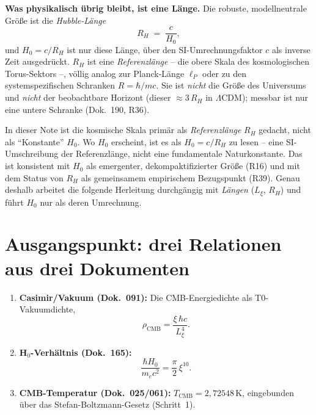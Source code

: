 \textbf{Was physikalisch übrig bleibt, ist eine Länge.} Die robuste,
modellneutrale Größe ist die \emph{Hubble-Länge}
\begin{equation}
  R_H \;=\; \frac{c}{H_0},
  \label{eq:RH}
\end{equation}
und $H_0 = c/R_H$ ist nur diese Länge, über den SI-Umrechnungsfaktor $c$ als
inverse Zeit ausgedrückt. $R_H$ ist eine \emph{Referenzlänge} -- die obere
Skala des kosmologischen Torus-Sektors --, völlig analog zur Planck-Länge
$\ell_P$ oder zu den systemspezifischen Schranken $R = \hbar/mc$. Sie ist
\emph{nicht} die Größe des Universums und \emph{nicht} der beobachtbare Horizont
(dieser $\approx 3\,R_H$ in $\Lambda$CDM); messbar ist nur eine untere Schranke
(Dok.~190, R36).

\begin{foundation}[Begriffsregelung]
In dieser Note ist die kosmische Skala primär als \emph{Referenzlänge} $R_H$
gedacht, nicht als \enquote{Konstante} $H_0$. Wo $H_0$ erscheint, ist es als
$H_0 = c/R_H$ zu lesen -- eine SI-Umschreibung der Referenzlänge, nicht eine
fundamentale Naturkonstante. Das ist konsistent mit $H_0$ als emergenter,
dekompaktifizierter Größe (R16) und mit dem Status von $R_H$ als gemeinsamem
empirischem Bezugspunkt (R39). Genau deshalb arbeitet die folgende Herleitung
durchgängig mit \emph{Längen} ($L_\xi$, $R_H$) und führt $H_0$ nur als deren
Umrechnung.
\end{foundation}

\section{Ausgangspunkt: drei Relationen aus drei Dokumenten}

\begin{foundation}
\begin{enumerate}
  \item \textbf{Casimir/Vakuum (Dok.~091):} Die CMB-Energiedichte als
        T0-Vakuumdichte,
        \begin{equation}
          \rho_\text{CMB} = \frac{\xi\,\hbar c}{L_\xi^4}.
          \label{eq:rhocmb}
        \end{equation}
  \item \textbf{H$_0$-Verhältnis (Dok.~165):}
        \begin{equation}
          \frac{\hbar H_0}{m_e c^2} = \frac{\pi}{2}\,\xi^{10}.
          \label{eq:h0}
        \end{equation}
  \item \textbf{CMB-Temperatur (Dok.~025/061):} $T_\text{CMB}=2{,}72548$\,K,
        eingebunden über das Stefan-Boltzmann-Gesetz (Schritt~1).
\end{enumerate}
\end{foundation}

